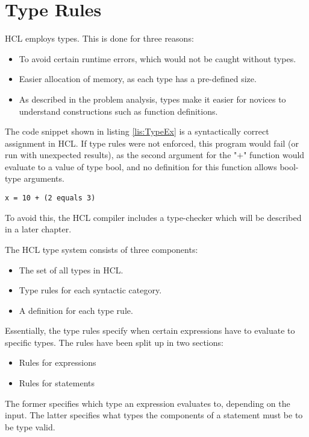 \section{Type Rules}
HCL employs types.
This is done for three reasons:
\begin{itemize}
	\item To avoid certain runtime errors, which would not be caught without types.
	\item Easier allocation of memory, as each type has a pre-defined size.
	\item As described in the problem analysis, types make it easier for novices to understand constructions such as function definitions.
\end{itemize}
The code snippet shown in listing \ref{lis:TypeEx} is a syntactically correct assignment in HCL.
If type rules were not enforced, this program would fail (or run with unexpected results), as the second argument for the "$+$" function would evaluate to a value of type bool, and no definition for this function allows bool-type arguments.

\begin{lstlisting}[language=HCL,label=lis:TypeEx,caption=An HCL expression,firstnumber=1]
x = 10 + (2 equals 3)
\end{lstlisting}

To avoid this, the HCL compiler includes a type-checker which will be described in a later chapter.

The HCL type system consists of three components:
\begin{itemize}
	\item The set of all types in HCL.
	\item Type rules for each syntactic category.
	\item A definition for each type rule.
\end{itemize}

Essentially, the type rules specify when certain expressions have to evaluate to specific types.
The rules have been split up in two sections:
\begin{itemize}
	\item Rules for expressions
	\item Rules for statements
\end{itemize}
The former specifies which type an expression evaluates to, depending on the input.
The latter specifies what types the components of a statement must be to be type valid.

